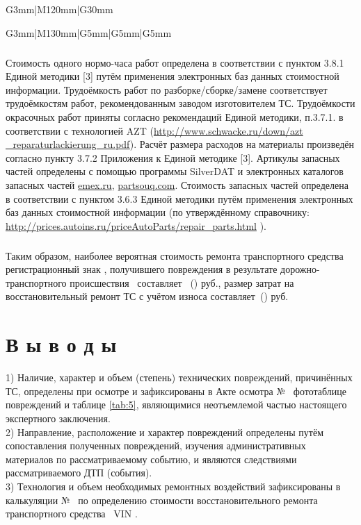 \begin{longtable}{G{3mm}|M{120mm}|G{30mm}}
\begin{longtable}{G{3mm}|M{130mm}|G{5mm}|G{5mm}|G{5mm}}
\subparagraph{}Стоимость одного нормо-часа работ определена в соответствии с пунктом 3.8.1 Единой методики [3] путём применения электронных баз данных стоимостной информации.
Трудоёмкость работ по разборке/сборке/замене  соответствует трудоёмкостям работ, рекомендованным заводом изготовителем ТС. Трудоёмкости окрасочных работ приняты согласно рекомендаций Единой методики, п.3.7.1. в соответствии с технологией  AZT (\url{http://www.schwacke.ru/down/azt _reparaturlackierung_ru.pdf}). Расчёт размера расходов на материалы произведён  согласно пункту 3.7.2 Приложения к Единой методике [3]. Артикулы запасных частей определены с помощью программы SilverDAT и электронных  каталогов запасных частей \url{emex.ru}, \url{partsouq.com}.
Стоимость запасных частей определена в соответствии с пунктом 3.6.3 Единой методики путём применения электронных баз данных стоимостной информации (по утверждённому справочнику: \url{http://prices.autoins.ru/priceAutoParts/repair_parts.html} ).
  
\subparagraph{}Таким образом,  наиболее вероятная стоимость ремонта транспортного средства \tc\, регистрационный знак , получившего повреждения в результате дорожно-транспортного происшествия  \, составляет  \, () руб.,  размер затрат на восстановительный ремонт ТС с учётом износа составляет  \,() руб.
      

\section{В ы в о д ы}


1) Наличие, характер и объем (степень) технических повреждений, причинённых ТС, определены при осмотре и зафиксированы в Акте осмотра № \NomerDoc\,  фототаблице повреждений и таблице \ref{tab:5}, являющимися неотъемлемой частью настоящего экспертного заключения.\\[3mm]
    
2) Направление, расположение и характер повреждений определены путём сопоставления полученных повреждений, изучения административных материалов по рассматриваемому событию, и  являются  следствиями рассматриваемого ДТП (события).\\[3mm]
    
3) Технология и объем необходимых ремонтных воздействий зафиксированы в калькуляции № \NomerDoc\, по определению стоимости восстановительного ремонта транспортного средства \tc\, VIN  \vin. \\[3mm]
    

\end{longtable}
\end{longtable}
